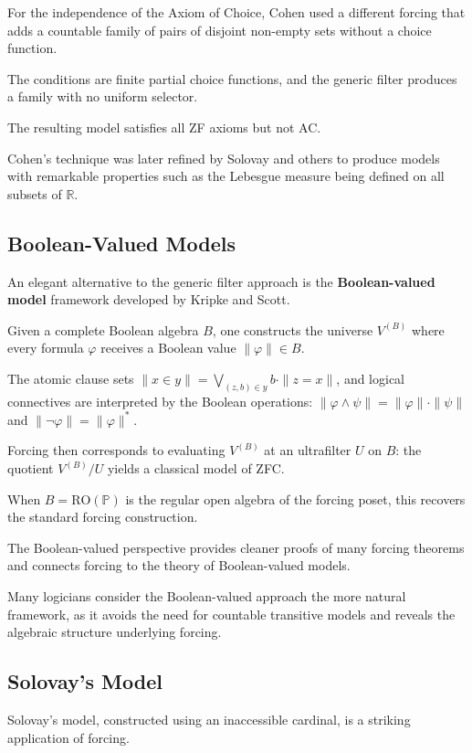 For the independence of the Axiom of Choice, Cohen used a different forcing that adds a countable family of pairs of disjoint non-empty sets without a choice function.

The conditions are finite partial choice functions, and the generic filter produces a family with no uniform selector.

The resulting model satisfies all ZF axioms but not AC.

Cohen's technique was later refined by Solovay and others to produce models with remarkable properties such as the Lebesgue measure being defined on all subsets of $\mathbb{R}$.

\subsection*{Boolean-Valued Models}

An elegant alternative to the generic filter approach is the \textbf{Boolean-valued model} framework developed by Kripke and Scott.

Given a complete Boolean algebra $B$, one constructs the universe $V^{(B)}$ where every formula $\varphi$ receives a Boolean value $\|\varphi\| \in B$.

The atomic clause sets $\|x \in y\| = \bigvee_{(z,b) \in y} b \cdot \|z = x\|$, and logical connectives are interpreted by the Boolean operations: $\|\varphi \land \psi\| = \|\varphi\| \cdot \|\psi\|$ and $\|\neg\varphi\| = \|\varphi\|^*$.

Forcing then corresponds to evaluating $V^{(B)}$ at an ultrafilter $U$ on $B$: the quotient $V^{(B)}/U$ yields a classical model of ZFC.

When $B = \text{RO}(\mathbb{P})$ is the regular open algebra of the forcing poset, this recovers the standard forcing construction.

The Boolean-valued perspective provides cleaner proofs of many forcing theorems and connects forcing to the theory of Boolean-valued models.

Many logicians consider the Boolean-valued approach the more natural framework, as it avoids the need for countable transitive models and reveals the algebraic structure underlying forcing.

\subsection*{Solovay's Model}

Solovay's model, constructed using an inaccessible cardinal, is a striking application of forcing.

